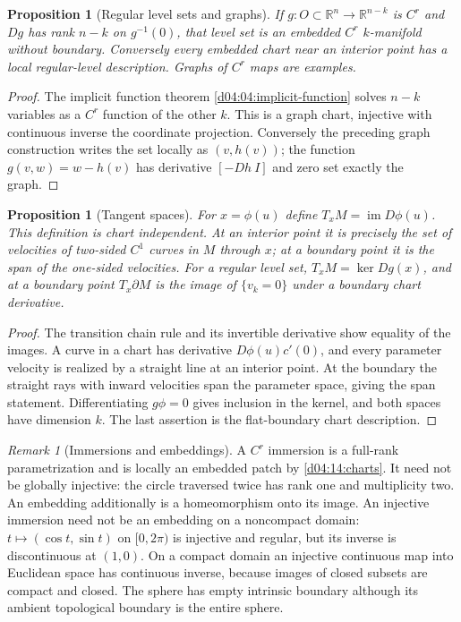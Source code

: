 \documentclass[11pt,oneside,openany]{book}
\newtheorem{proposition}[theorem]{Proposition}
\theoremstyle{definition}
\theoremstyle{remark}
\newtheorem{remark}[theorem]{Remark}
\newcommand{\R}{\mathbb R}
\newcommand{\family}[1]{}
\begin{document}
\begin{proposition}[Regular level sets and graphs]\label{d04:14:level}
If $g:O\subset\R^n\to\R^{n-k}$ is $C^r$ and $Dg$ has rank $n-k$
on $g^{-1}(0)$, that level set is an embedded $C^r$ $k$-manifold without
boundary. Conversely every embedded chart near an interior point has a
local regular-level description. Graphs of $C^r$ maps are examples.
\end{proposition}
\begin{proof}
The implicit function theorem \cref{d04:04:implicit-function} solves $n-k$ variables
as a $C^r$ function of the other $k$. This is a graph chart, injective with
continuous inverse the coordinate projection. Conversely the preceding
graph construction writes the set locally as $(v,h(v))$; the function
$g(v,w)=w-h(v)$ has derivative $[-Dh\ I]$ and zero set exactly the graph.
\end{proof}

\family{K04.14.03}
\begin{proposition}[Tangent spaces]\label{d04:14:tangent}
For $x=\phi(u)$ define $T_xM=\operatorname{im}D\phi(u)$. This definition
is chart independent. At an interior point it is precisely the set of
velocities of two-sided $C^1$ curves in $M$ through $x$; at a boundary
point it is the span of the one-sided velocities. For a regular level set,
$T_xM=\ker Dg(x)$, and at a boundary point $T_x\partial M$ is the
image of $\{v_k=0\}$ under a boundary chart derivative.
\end{proposition}
\begin{proof}
The transition chain rule and its invertible derivative show equality of
the images. A curve in a chart has derivative $D\phi(u)c'(0)$, and every
parameter velocity is realized by a straight line at an interior point.
At the boundary the straight rays with inward velocities span the parameter
space, giving the span statement. Differentiating $g\phi=0$ gives inclusion
in the kernel, and both spaces have dimension $k$. The last assertion is
the flat-boundary chart description.
\end{proof}

\begin{remark}[Immersions and embeddings]\label{d04:14:immersion}
A $C^r$ immersion is a full-rank parametrization and is locally an embedded
patch by \cref{d04:14:charts}. It need not be globally injective: the circle
traversed twice has rank one and multiplicity two. An embedding additionally
is a homeomorphism onto its image. An injective immersion need not be an
embedding on a noncompact domain: $t\mapsto(\cos t,\sin t)$ on $[0,2\pi)$
is injective and regular, but its inverse is discontinuous at $(1,0)$.
On a compact domain an injective continuous map into Euclidean space has
continuous inverse, because images of closed subsets are compact and closed.
The sphere has empty intrinsic boundary although its ambient topological
boundary is the entire sphere.
\end{remark}
\end{document}

